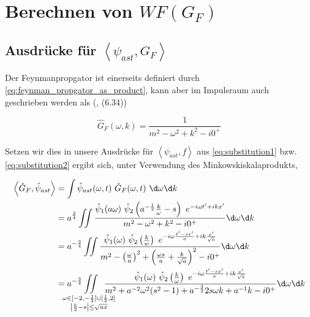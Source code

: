 \section{\texorpdfstring{Berechnen von $WF(G_F)$}
        {Berechnen von WF(Gf)}} %
\label{sec:berechnen_von_}

\subsection{\texorpdfstring{Ausdrücke für $\left< \psi_{ast}, G_F\right>$}
        {Ausdrücke für psi ast, gf}} %
\label{sec:psiast_gf}

Der Feynmanpropgator ist einerseits definiert durch \cref{eq:feynman_propgator_as_product}, kann aber im Impulsraum auch geschrieben werden als (\textcite{Schwartz2014}, (6.34))

\begin{equation}
\label{eq:gf}
    \hat G_F(\omega, k) = \frac{1}{m^2 - \omega^2 + k^2 - i 0^+}
\end{equation}

Setzen wir dies in unsere Ausdrücke für $\left< \psi_{ast}, f\right>$ aus \ref{eq:substitution1}
bzw. \ref{eq:substitution2} ergibt sich, unter Verwendung des Minkowskiskalaprodukts,

\begin{align}
\left<  \hat G_F, \hat\psi_{ast} \right> &=
    \int \hat \psi_{ast}(\omega, t) ~\hat G_F(\omega, t) ~\d \omega \d k
    \nonumber \\
    &=
    a^{\frac{3}{4}} \iint \frac{
        \hat \psi_1 (a \omega)
        ~\hat \psi_2 \left(a^{-\frac{1}{2}}\frac{k}{\omega} - s\right)
        ~ e^{-i\omega t' + i k x'}
    }
    {
        m^2 - \omega^2 + k^2 - i 0^+
    }
    \d \omega \d k
    \nonumber \\
    &=
    a^{-\frac{3}{4}} \iint \frac{
        \hat\psi_1(\omega)
        ~\hat \psi_2\left(\tfrac{k}{w}\right)
        ~e^{-i \omega \frac{t' - sx'}{a} + ik \frac{x'}{\sqrt{a}}}
    }
    {
        m^2 - \left(\frac{\omega}{a}\right)^2
        + \left(\frac{\omega s}{a} + \frac{k}{\sqrt{a}}\right)^2 - i0^+
    }
    \d \omega \d k \nonumber \\
    &=
    a^{-\frac{3}{4}}
    \kern -2em \iint
    \limits_{
    \substack{
        \omega \in [-2, -\frac{1}{2}]\cup[\frac{1}{2},2] \\
        \left|\frac{k}{2}-s\right| \leq \sqrt{ax}
        }
    }
    \kern -1.5em
    \frac{
        \hat\psi_1(\omega)
        ~\hat \psi_2\left(\tfrac{k}{\omega}\right)
        ~e^{-i \omega \frac{t' - sx'}{a} + ik \frac{x'}{\sqrt{a}}}
    }
    {
        m^2 + a^{-2} \omega^2 (s^2 - 1) + a^{-\frac{3}{2}} 2 s \omega k + a^{-1} k  - i0^+
    }
    \d \omega \d k
    \label{eq:psi_ast_gf_1}
\end{align}

